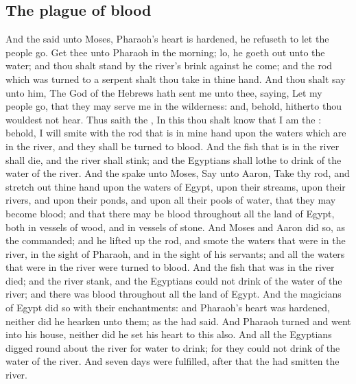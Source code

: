 \begin{biblechapter}
\section*{The plague of blood}
\verse And the \LORD said unto Moses, Pharaoh's heart is hardened, he refuseth to let the people go.
\verse Get thee unto Pharaoh in the morning; lo, he goeth out unto the water; and thou shalt stand by the river's brink against he come; and the rod which was turned to a serpent shalt thou take in thine hand.
\verse And thou shalt say unto him, The \LORD God of the Hebrews hath sent me unto thee, saying, Let my people go, that they may serve me in the wilderness: and, behold, hitherto thou wouldest not hear.
\verse Thus saith the \LORD, In this thou shalt know that I am the \LORD: behold, I will smite with the rod that is in mine hand upon the waters which are in the river, and they shall be turned to blood.
\verse And the fish that is in the river shall die, and the river shall stink; and the Egyptians shall lothe to drink of the water of the river.
\verse And the \LORD spake unto Moses, Say unto Aaron, Take thy rod, and stretch out thine hand upon the waters of Egypt, upon their streams, upon their rivers, and upon their ponds, and upon all their pools of water, that they may become blood; and that there may be blood throughout all the land of Egypt, both in vessels of wood, and in vessels of stone.
\verse And Moses and Aaron did so, as the \LORD commanded; and he lifted up the rod, and smote the waters that were in the river, in the sight of Pharaoh, and in the sight of his servants; and all the waters that were in the river were turned to blood.
\verse And the fish that was in the river died; and the river stank, and the Egyptians could not drink of the water of the river; and there was blood throughout all the land of Egypt.
\verse And the magicians of Egypt did so with their enchantments: and Pharaoh's heart was hardened, neither did he hearken unto them; as the \LORD had said.
\verse And Pharaoh turned and went into his house, neither did he set his heart to this also.
\verse And all the Egyptians digged round about the river for water to drink; for they could not drink of the water of the river.
\verse And seven days were fulfilled, after that the \LORD had smitten the river.
\end{biblechapter}

